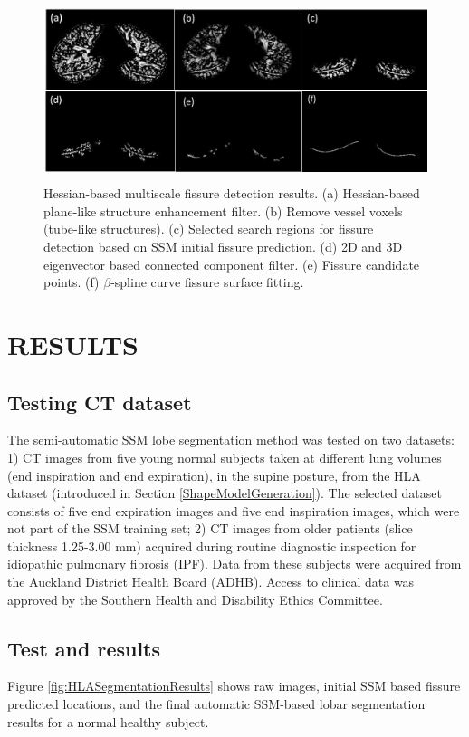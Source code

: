 \documentclass[]{spie}  %
\begin{document}
{\begin{figure}[htbp]
  \centering 
  \includegraphics[height=2.1in]{Image/WholeFissureDetection.jpg}
  \caption{Hessian-based multiscale fissure detection results. (a) Hessian-based plane-like structure enhancement filter. (b) Remove vessel voxels (tube-like structures). (c) Selected search regions for fissure detection based on SSM initial fissure prediction. (d) 2D and 3D eigenvector based connected component filter. (e) Fissure candidate points. (f) $\beta$-spline curve fissure surface fitting.}
  \label{fig:FissureDetection}
\end{figure}

\section{RESULTS}
\label{SegmentationExperiment}
 
\subsection{Testing CT dataset}

The semi-automatic SSM lobe segmentation method was tested on two datasets: 1) CT images from five young normal subjects taken at different lung volumes (end inspiration and end expiration), in the supine posture, from the HLA dataset (introduced in Section \ref{ShapeModelGeneration}). The selected dataset consists of five end expiration images and five end inspiration images, which were not part of the SSM training set; 2) CT images from older patients (slice thickness 1.25-3.00 mm) acquired during routine diagnostic inspection for idiopathic pulmonary fibrosis (IPF). Data from these subjects were acquired from the Auckland District Health Board (ADHB). Access to clinical data was approved by the Southern Health and Disability Ethics Committee. 

\subsection{Test and results}
Figure \ref{fig:HLASegmentationResults} shows raw images, initial SSM based fissure predicted locations, and the final automatic SSM-based lobar segmentation results for a normal healthy subject.  

}
\end{document}
